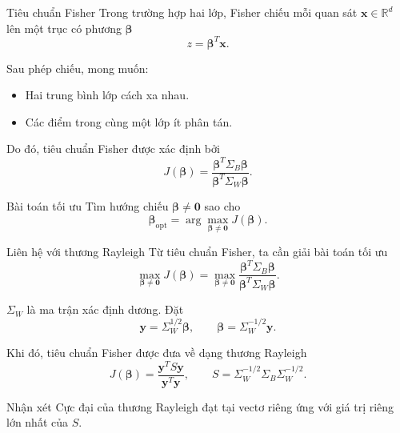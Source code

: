 \documentclass{beamer}
\def\bsx{\bm{x}}
\def\R{\mathbb{R}}
\begin{document}
\begin{frame}{Tiêu chuẩn Fisher}
	Trong trường hợp hai lớp, Fisher chiếu mỗi quan sát \(\bsx\in\R^d\) lên một trục có phương \(\bm{\beta}\)
	\[
	z=\bm{\beta}^T\bsx.
	\]
	
	Sau phép chiếu, mong muốn:
	\begin{itemize}
		\item Hai trung bình lớp cách xa nhau.
		\item Các điểm trong cùng một lớp ít phân tán.
	\end{itemize}
	
	Do đó, tiêu chuẩn Fisher được xác định bởi
	\[
	J(\bm{\beta})
	=
	\frac{\bm{\beta}^T\Sigma_B\bm{\beta}}
	{\bm{\beta}^T\Sigma_W\bm{\beta}}.
	\]
	
	\begin{block}{Bài toán tối ưu}
		Tìm hướng chiếu \(\bm{\beta}\neq \bm{0}\) sao cho
		\[
		\bm{\beta}_{\text{opt}}
		=
		\arg\max_{\bm{\beta}\neq \bm{0}}
		J(\bm{\beta}).
		\]
	\end{block}
\end{frame}


	

\begin{frame}{Liên hệ với thương Rayleigh}
	Từ tiêu chuẩn Fisher, ta cần giải bài toán tối ưu
	\begin{equation}
		\max_{\bm{\beta}\neq \bm{0}}
		J(\bm{\beta})
		=
		\max_{\bm{\beta}\neq \bm{0}}
		\frac{\bm{\beta}^T\Sigma_B\bm{\beta}}
		{\bm{\beta}^T\Sigma_W\bm{\beta}}.
		\tag{1}
	\end{equation}
	
	\(\Sigma_W\) là ma trận xác định dương. Đặt
	\begin{equation}
		\bm{y}=\Sigma_W^{1/2}\bm{\beta},
		\qquad
		\bm{\beta}=\Sigma_W^{-1/2}\bm{y}.
		\tag{2}
	\end{equation}
	
	Khi đó, tiêu chuẩn Fisher được đưa về dạng thương Rayleigh
	\begin{equation}
		J(\bm{\beta})
		=
		\frac{\bm{y}^T S\bm{y}}{\bm{y}^T\bm{y}},
		\qquad
		S=
		\Sigma_W^{-1/2}\Sigma_B\Sigma_W^{-1/2}.
		\tag{3}
	\end{equation}
	
	\begin{block}{Nhận xét}
		Cực đại của thương Rayleigh đạt tại vectơ riêng ứng với giá trị riêng lớn nhất của \(S\).
	\end{block}
\end{frame}
\end{document}
